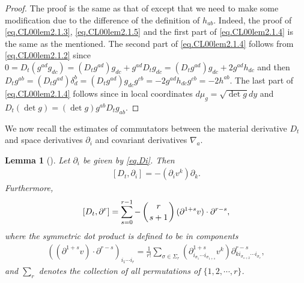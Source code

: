 \documentclass[12pt,reqno]{amsart}
\numberwithin{equation}{section}
\newtheorem{lemma}[theorem]{Lemma}
\theoremstyle{definition}
\theoremstyle{remark}
\begin{document}
\begin{proof}
  The proof is the same as that of \cite[Lemma 2.1]{CL00} except that we need to make some modification due to the difference of the definition of $h_{ab}$. Indeed, the proof of \eqref{eq.CL00lem2.1.3}, \eqref{eq.CL00lem2.1.5} and the first part of \eqref{eq.CL00lem2.1.4} is the same as the mentioned. The second part of \eqref{eq.CL00lem2.1.4} follows from \eqref{eq.CL00lem2.1.2} since $0=D_t(g^{ad}g_{dc})=(D_tg^{ad}) g_{dc}+g^{ad}D_t g_{dc}=(D_tg^{ad}) g_{dc}+2g^{ad}h_{dc}$ and then $D_t g^{ab}=(D_tg^{ad})\delta_d^b=(D_tg^{ad}) g_{dc}g^{cb}=-2g^{ad}h_{dc}g^{cb}=-2h^{ab}$. The last part of \eqref{eq.CL00lem2.1.4} follows since in local coordinates $d\mu_g=\sqrt{\det g}dy$ and $D_t(\det g)=(\det g ) g^{ab}D_tg_{ab}$.
\end{proof}

We now recall the estimates of commutators between the material derivative $D_t$ and space derivatives ${\partial}_i$ and covariant derivatives ${\nabla}_a$.

\begin{lemma}[\mbox{\cite[Lemma 2.3]{CL00}}]
  Let ${\partial}_i$ be given by \eqref{eq.Di}. Then
  \begin{align}\label{eq.DtDi}
    [D_t,{\partial}_i]=-({\partial}_i v^k){\partial}_k.
  \end{align}
  Furthermore,
  \begin{align}\label{eq.DtDir}
    [D_t,{\partial}^r]=\sum_{s=0}^{r-1}-\left(r\atop s+1\right)({\partial}^{1+s}v)\cdot {\partial}^{r-s},
  \end{align}
  where the symmetric dot product is defined to be in components
  \begin{align}
    \left(({\partial}^{1+s}v)\cdot {\partial}^{r-s}\right)_{i_1\cdots i_r}=\frac{1}{r!}\sum_{\sigma\in \Sigma_r}\left({\partial}_{i_{\sigma_1}\cdots i_{\sigma_{1+s}}}^{1+s} v^k\right){\partial}_{ki_{\sigma_{s+2}}\cdots i_{\sigma_r}}^{r-s},
  \end{align}
  and $\sum_r$ denotes the collection of all permutations of $\{1,2,\cdots, r\}$.
\end{lemma}
\end{document}
